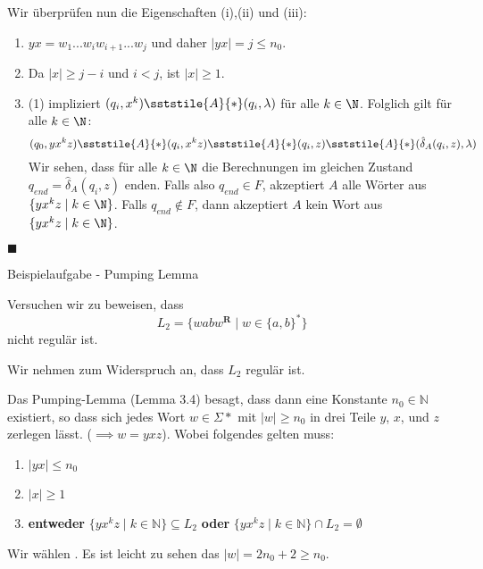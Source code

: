     Wir überprüfen nun die Eigenschaften (i),(ii) und (iii):
    \begin{enumerate}[label = (\roman*)]
        \item $yx = w_1...w_iw_{i+1}...w_j$ und daher $|yx| = j \leq n_0$.
        \item Da $|x| \geq j-i$ und $i < j$, ist $|x| \geq 1$.
        \item (1) impliziert $(q_i, x^k) \sststile{A}{*} (q_i, \lambda)$ für alle $k \in \N$.
        Folglich gilt für alle $k \in \N$:
        $$(q_0, yx^kz) \sststile{A}{*} (q_i, x^kz) \sststile{A}{*} (q_i, z) \sststile{A}{*} (\hat{\delta}_A(q_i, z), \lambda)$$
        Wir sehen, dass für alle $k \in \N$ die Berechnungen im gleichen Zustand $q_{end} = \hat{\delta}_A(q_i, z)$ enden. Falls also $q_{end} \in F$, akzeptiert $A$ alle Wörter aus $\{yx^kz \mid k \in \N\}$. Falls $q_{end}\notin F$, dann akzeptiert $A$ kein Wort aus $\{yx^kz \mid k \in \N\}$.
    \end{enumerate}
    \hspace*{0pt}\hfill$\blacksquare$



    \begin{subbox}{Beispielaufgabe - Pumping Lemma}

    Versuchen wir zu beweisen, dass 
    $$L_2 = \{wabw^{\textbf{R}} \mid w \in \{a,b\}^*\}$$
    nicht regulär ist.
    \end{subbox}

    Wir nehmen zum Widerspruch an, dass $L_2$ regulär ist. 

Das Pumping-Lemma (Lemma 3.4) besagt, dass dann eine Konstante $n_0 \in \mathbb{N}$ existiert, so dass sich jedes Wort $w \in \Sigma*$ mit $|w| \geq n_0$ in drei Teile $y$, $x$, und $z$ zerlegen lässt. ($\implies w = yxz$). Wobei folgendes gelten muss:
\begin{enumerate}[label=(\roman*)]
    \item  $|yx| \leq n_0$
    \item $|x| \geq 1$
    \item \textbf{entweder} $\{yx^kz \mid k \in \mathbb{N} \} \subseteq L_2$ \textbf{oder} $\{yx^kz \mid k \in \mathbb{N} \} \cap L_2 = \emptyset$
\end{enumerate}

    Wir wählen . Es ist leicht zu sehen das $|w| = 2n_0 + 2 \geq n_0$. \newline \newline


